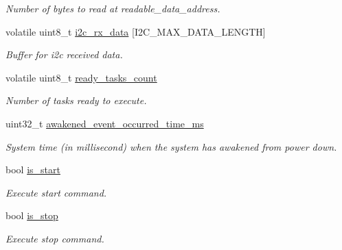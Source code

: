 \begin{DoxyCompactItemize}
\begin{DoxyCompactList}\small\item\em Number of bytes to read at readable\+\_\+data\+\_\+address. \end{DoxyCompactList}\item 
\mbox{\label{i2c-rain_8h_ae22f16db01d254c3709565e8347c05af}} 
volatile uint8\+\_\+t \hyperlink{i2c-rain_8h_ae22f16db01d254c3709565e8347c05af}{i2c\+\_\+rx\+\_\+data} \mbox{[}I2\+C\+\_\+\+M\+A\+X\+\_\+\+D\+A\+T\+A\+\_\+\+L\+E\+N\+G\+TH\mbox{]}
\begin{DoxyCompactList}\small\item\em Buffer for i2c received data. \end{DoxyCompactList}\item 
\mbox{\label{i2c-rain_8h_ad51737114d6776c16525958973815d50}} 
volatile uint8\+\_\+t \hyperlink{i2c-rain_8h_ad51737114d6776c16525958973815d50}{ready\+\_\+tasks\+\_\+count}
\begin{DoxyCompactList}\small\item\em Number of tasks ready to execute. \end{DoxyCompactList}\item 
\mbox{\label{i2c-rain_8h_a82dc7d1671e2febacdbd9a3c3a3283cd}} 
uint32\+\_\+t \hyperlink{i2c-rain_8h_a82dc7d1671e2febacdbd9a3c3a3283cd}{awakened\+\_\+event\+\_\+occurred\+\_\+time\+\_\+ms}
\begin{DoxyCompactList}\small\item\em System time (in millisecond) when the system has awakened from power down. \end{DoxyCompactList}\item 
\mbox{\label{i2c-rain_8h_a2a9792771d5af0df80ed2adf7c5dc0cf}} 
bool \hyperlink{i2c-rain_8h_a2a9792771d5af0df80ed2adf7c5dc0cf}{is\+\_\+start}
\begin{DoxyCompactList}\small\item\em Execute start command. \end{DoxyCompactList}\item 
\mbox{\label{i2c-rain_8h_ad2dc9b34342f31d98c692c9b5ff3c5a9}} 
bool \hyperlink{i2c-rain_8h_ad2dc9b34342f31d98c692c9b5ff3c5a9}{is\+\_\+stop}
\begin{DoxyCompactList}\small\item\em Execute stop command. \end{DoxyCompactList}\item 

\end{DoxyCompactItemize}
